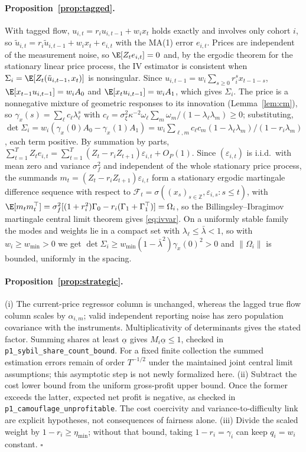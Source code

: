 \paragraph{Proposition~\ref{prop:tagged}.} With tagged flow, $u_{i,t}=r_iu_{i,t-1}+w_ix_t$ holds exactly and involves only cohort $i$, so $\tilde u_{i,t}=r_i\tilde u_{i,t-1}+w_ix_t+e_{i,t}$ with the MA(1) error $e_{i,t}$. Prices are independent of the measurement noise, so $\E[Z_te_{i,t}]=0$ and, by the ergodic theorem for the stationary linear price process, the IV estimator is consistent when $\Sigma_i=\E[Z_t(\tilde u_{i,t-1},x_t)]$ is nonsingular. Since $u_{i,t-1}=w_i\sum_{s\ge0}r_i^sx_{t-1-s}$, $\E[x_{t-1}u_{i,t-1}]=w_iA_0$ and $\E[x_tu_{i,t-1}]=w_iA_1$, which gives $\Sigma_i$. The price is a nonnegative mixture of geometric responses to its innovation (Lemma~\ref{lem:cm}), so $\gamma_x(s)=\sum_\ell c_\ell\lambda_\ell^{s}$ with $c_\ell=\sigma_\xi^2\kappa^{-2}\omega_\ell\sum_m\omega_m/(1-\lambda_\ell\lambda_m)\ge0$; substituting, $\det\Sigma_i=w_i(\gamma_x(0)A_0-\gamma_x(1)A_1)=w_i\sum_{\ell,m}c_\ell c_m(1-\lambda_\ell\lambda_m)/(1-r_i\lambda_m)$, each term positive. By summation by parts, $\sum_{t=1}^TZ_te_{i,t}=\sum_{t=1}^T(Z_t-r_iZ_{t+1})\varepsilon_{i,t}+O_P(1)$. Since $(\varepsilon_{i,t})$ is i.i.d.\ with mean zero and variance $\sigma_f^2$ and independent of the whole stationary price process, the summands $m_t=(Z_t-r_iZ_{t+1})\varepsilon_{i,t}$ form a stationary ergodic martingale difference sequence with respect to $\mathcal F_t=\sigma((x_s)_{s\in\mathbb Z},\varepsilon_{i,s}:s\le t)$, with $\E[m_tm_t^\top]=\sigma_f^2[(1+r_i^2)\Gamma_0-r_i(\Gamma_1+\Gamma_1^\top)]=\Omega_i$, so the Billingsley--Ibragimov martingale central limit theorem gives \eqref{eq:ivvar}. On a uniformly stable family the modes and weights lie in a compact set with $\lambda_\ell\le\bar\lambda<1$, so with $w_i\ge w_{\min}>0$ we get $\det\Sigma_i\ge w_{\min}(1-\bar\lambda^2)\gamma_x(0)^2>0$ and $\|\Omega_i\|$ is bounded, uniformly in the spacing.

\paragraph{Proposition~\ref{prop:strategic}.} (i) The current-price regressor column is unchanged, whereas the lagged true flow column scales by $\alpha_{i,m}$; valid independent reporting noise has zero population covariance with the instruments. Multiplicativity of determinants gives the stated factor. Summing shares at least $\underline\alpha$ gives $M_i\underline\alpha\le1$, checked in \nolinkurl{p1_sybil_share_count_bound}. For a fixed finite collection the summed estimation errors remain of order $T^{-1/2}$ under the maintained joint central limit assumptions; this asymptotic step is not newly formalized here. (ii) Subtract the cost lower bound from the uniform gross-profit upper bound. Once the former exceeds the latter, expected net profit is negative, as checked in \nolinkurl{p1_camouflage_unprofitable}. The cost coercivity and variance-to-difficulty link are explicit hypotheses, not consequences of fairness alone. (iii) Divide the scaled weight by $1-r_i\ge\eta_{\min}$; without that bound, taking $1-r_i=\gamma_i$ can keep $q_i=w_i$ constant. $\square$

